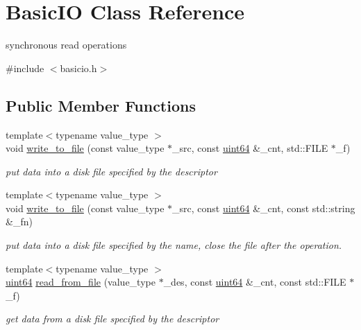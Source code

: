 \hypertarget{class_basic_i_o}{}\section{Basic\+IO Class Reference}
\label{class_basic_i_o}


synchronous read operations  




{\ttfamily \#include $<$basicio.\+h$>$}

\subsection*{Public Member Functions}
\begin{DoxyCompactItemize}
\item 
{\footnotesize template$<$typename value\+\_\+type $>$ }\\void \hyperlink{class_basic_i_o_a890e7521a5a2e33eae4d52ec77a196a5}{write\+\_\+to\+\_\+file} (const value\+\_\+type $\ast$\+\_\+src, const \hyperlink{types_8h_a60e8696a4678cd348e991a1f172e53f7}{uint64} \&\+\_\+cnt, std\+::\+F\+I\+LE $\ast$\+\_\+f)
\begin{DoxyCompactList}\small\item\em put data into a disk file specified by the descriptor \end{DoxyCompactList}\item 
{\footnotesize template$<$typename value\+\_\+type $>$ }\\void \hyperlink{class_basic_i_o_a1bcd7dbe1acd71bafa1b5d6d4fc32e9e}{write\+\_\+to\+\_\+file} (const value\+\_\+type $\ast$\+\_\+src, const \hyperlink{types_8h_a60e8696a4678cd348e991a1f172e53f7}{uint64} \&\+\_\+cnt, const std\+::string \&\+\_\+fn)
\begin{DoxyCompactList}\small\item\em put data into a disk file specified by the name, close the file after the operation. \end{DoxyCompactList}\item 
{\footnotesize template$<$typename value\+\_\+type $>$ }\\\hyperlink{types_8h_a60e8696a4678cd348e991a1f172e53f7}{uint64} \hyperlink{class_basic_i_o_a5e1c1be36914e4749f4a4bd0cf1b53d0}{read\+\_\+from\+\_\+file} (value\+\_\+type $\ast$\+\_\+des, const \hyperlink{types_8h_a60e8696a4678cd348e991a1f172e53f7}{uint64} \&\+\_\+cnt, const std\+::\+F\+I\+LE $\ast$\+\_\+f)
\begin{DoxyCompactList}\small\item\em get data from a disk file specified by the descriptor \end{DoxyCompactList}\item 

\end{DoxyCompactItemize}
